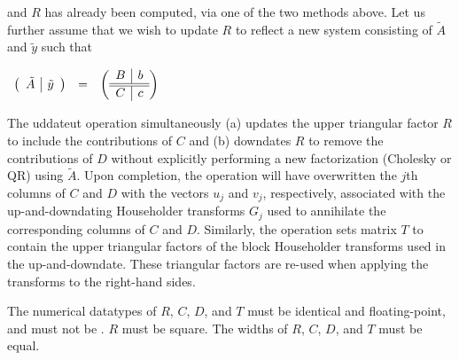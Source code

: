 \begin{flaspec}
{and $ R $ has already been computed, via one of the two methods above.
Let us further assume that we wish to update $ R $ to reflect a new
system consisting of $ \tilde A $ and $ \tilde y $ such that
\begin{center}
\begin{math}
\begin{array}{ccc}
\left(
\begin{array}{c | c}
\tilde A & \tilde y
\end{array}
\right)
& = &
\left(
\begin{array}{c | c}
B & b \\ \hline \hline
C & c
\end{array}
\right)
\end{array}
\end{math}
\end{center}
The {\sc uddateut} operation simultaneously (a) updates the upper
triangular factor $ R $ to include the contributions of $ C $ and (b)
downdates $ R $ to remove the contributions of $ D $ without explicitly
performing a new factorization (Cholesky or QR) using $ \tilde A $. 
Upon completion, the operation will have overwritten the $ j $th columns
of $ C $ and $ D $ with the vectors $ u_j $ and $ v_j $, respectively,
associated with the up-and-downdating Householder transforms $ G_j $ used
to annihilate the corresponding columns of $ C $ and $ D $.
Similarly, the operation sets matrix $ T $ to contain the upper triangular
factors of the block Householder transforms used in the up-and-downdate.
These triangular factors are re-used when applying the transforms to the
right-hand sides.
}
\begin{checks}
\checkitem
The numerical datatypes of $ R $, $ C $, $ D $, and $ T $ must be identical and
floating-point, and must not be \flaconstantns.
\itemvsp
\checkitem
$ R $ must be square.
\itemvsp
\checkitem
The widths of $ R $, $ C $, $ D $, and $ T $ must be equal.
\end{checks}
\begin{params}
\end{params}
\end{flaspec}

